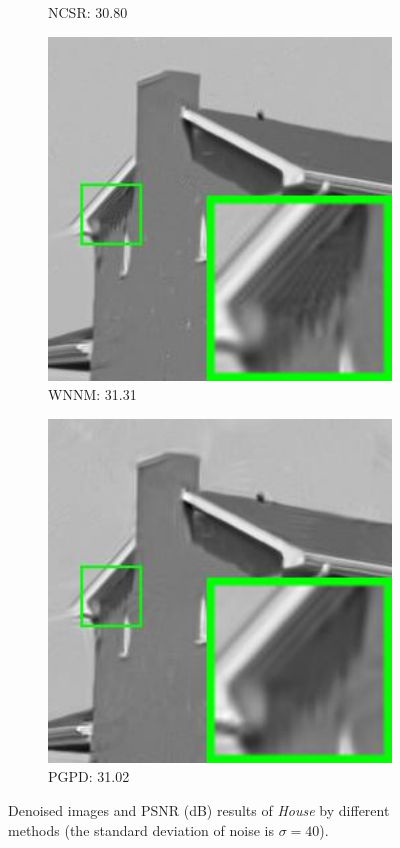 \begin{figure}
\begin{subfigure}[t]{0.24\textwidth}
		\caption{NCSR: 30.80}
    \end{subfigure}
    \hfill
    \begin{subfigure}[t]{0.24\textwidth}
        \centering
        \includegraphics[width=1\textwidth]{images/pgpd/br_WNNM_40_house.jpg}
		\caption{WNNM: 31.31}
    \end{subfigure}
    \hfill
    \begin{subfigure}[t]{0.24\textwidth}
        \centering
        \includegraphics[width=1\textwidth]{images/pgpd/br_our_40_house.jpg}
		\caption{PGPD: 31.02}
    \end{subfigure}
    \caption{Denoised images and PSNR (dB) results of \textsl{House} by different methods (the standard deviation of noise is $\sigma=40$).}
    \label{fig2-11}
\end{figure}

